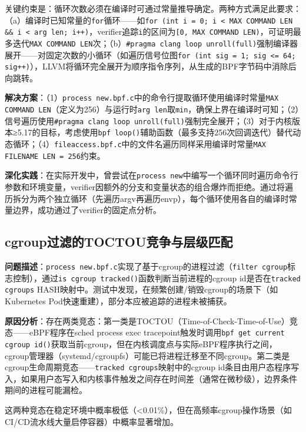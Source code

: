 \documentclass[a4paper]{ctexart}
\makeatletter
\renewcommand{\_}{%
  \ifmmode
    \nfss@text{\textunderscore}%
  \else
    \textunderscore\discretionary{}{}{}%
  \fi}
\makeatother
\begin{document}
关键约束是：循环次数必须在编译时可通过常量推导确定。两种方式满足此要求：（a）编译时已知常量的\texttt{for}循环——如\texttt{for (int i = 0; i < MAX\_COMMAND\_LEN \&\& i < arg\_len; i++)}，verifier追踪\texttt{i}的区间为\texttt{[0, MAX\_COMMAND\_LEN)}，可证明最多迭代\texttt{MAX\_COMMAND\_LEN}次；（b）\texttt{\#pragma clang loop unroll(full)}强制编译器展开——对固定次数的小循环（如遍历信号位图\texttt{for (int sig = 1; sig <= 64; sig++)}），LLVM将循环完全展开为顺序指令序列，从生成的BPF字节码中消除后向跳转。


\textbf{解决方案}：（1）\texttt{process\_new.bpf.c}中的命令行提取循环使用编译时常量\texttt{MAX\_COMMAND\_LEN}（定义为256）与运行时\texttt{arg\_len}取\texttt{min}，确保上界在编译时可知；（2）信号遍历使用\texttt{\#pragma clang loop unroll(full)}强制完全展开；（3）对于内核版本≥5.17的目标，考虑使用\texttt{bpf\_loop()}辅助函数（最多支持256次回调迭代）替代动态循环；（4）\texttt{fileaccess.bpf.c}中的文件名遍历同样采用编译时常量\texttt{MAX\_FILENAME\_LEN = 256}约束。


\textbf{深化实践}：在实际开发中，曾尝试在\texttt{process\_new}中编写一个循环同时遍历命令行参数和环境变量，verifier因额外的分支和变量状态的组合爆炸而拒绝。通过将遍历拆分为两个独立循环（先遍历argv再遍历envp），每个循环使用各自的编译时常量边界，成功通过了verifier的固定点分析。


\subsection{cgroup过滤的TOCTOU竞争与层级匹配}



\textbf{问题描述}：\texttt{process\_new.bpf.c}实现了基于cgroup的进程过滤（\texttt{filter\_cgroup}标志控制），通过\texttt{is\_cgroup\_tracked()}函数判断当前进程的cgroup\_id是否在\texttt{tracked\_cgroups} HASH映射中。测试中发现，在频繁创建/销毁cgroup的场景下（如Kubernetes Pod快速重建），部分本应被追踪的进程未被捕获。


\textbf{原因分析}：存在两类竞态：第一类是TOCTOU（Time-of-Check-Time-of-Use）竞态——eBPF程序在sched\_process\_exec tracepoint触发时调用\texttt{bpf\_get\_current\_cgroup\_id()}获取当前cgroup，但在内核调度点与实际eBPF程序执行之间，cgroup管理器（systemd/cgroupfs）可能已将进程迁移至不同cgroup。第二类是cgroup生命周期竞态——\texttt{tracked\_cgroups}映射中的cgroup\_id条目由用户态程序写入，如果用户态写入和内核事件触发之间存在时间差（通常在微秒级），边界条件期间的进程可能漏检。


这两种竞态在稳定环境中概率极低（<0.01\%），但在高频率cgroup操作场景（如CI/CD流水线大量启停容器）中概率显著增加。
\end{document}
